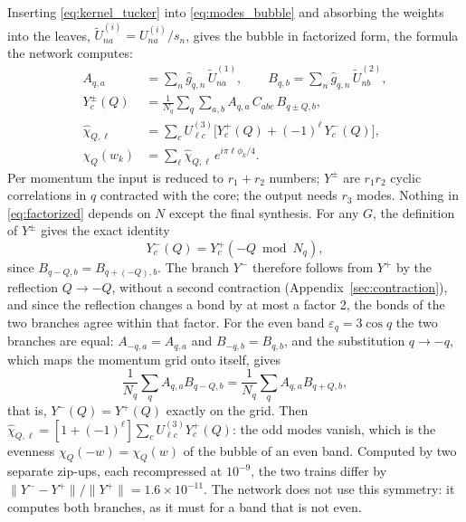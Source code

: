 \documentclass[aps,prb,reprint,a4paper]{revtex4-2}
\begin{document}
Inserting \eqref{eq:kernel_tucker} into \eqref{eq:modes_bubble} and absorbing the weights into the leaves, $\tilde U^{(i)}_{na}=U^{(i)}_{na}/s_n$, gives the bubble in factorized form, the formula the network computes:
\begin{equation}
\begin{aligned}
A_{q,a}&=\sum_n\hat g_{q,n}\,\tilde U^{(1)}_{na},\qquad B_{q,b}=\sum_n\hat g_{q,n}\,\tilde U^{(2)}_{nb},\\
Y^\pm_c(Q)&=\frac1{N_q}\sum_q\sum_{a,b}A_{q,a}\,C_{abc}\,B_{q\pm Q,b},\\
\hat\chi_{Q,\ell}&=\sum_cU^{(3)}_{\ell c}\Big[Y^+_c(Q)+(-1)^\ell\,Y^-_c(Q)\Big],\\
\chi_Q(w_k)&=\sum_\ell\hat\chi_{Q,\ell}\,e^{i\pi\ell\phi_k/4}.
\end{aligned}
\label{eq:factorized}
\end{equation}
Per momentum the input is reduced to $r_1+r_2$ numbers; $Y^\pm$ are $r_1r_2$ cyclic correlations in $q$ contracted with the core; the output needs $r_3$ modes. Nothing in \eqref{eq:factorized} depends on $N$ except the final synthesis. For any $G$, the definition of $Y^\pm$ gives the exact identity
\begin{equation}
  Y^-_c(Q)=Y^+_c(-Q\bmod N_q),
  \label{eq:yminus_identity}
\end{equation}
since $B_{q-Q,b}=B_{q+(-Q),b}$. The branch $Y^-$ therefore follows from $Y^+$ by the reflection $Q\to-Q$, without a second contraction (Appendix~\ref{sec:contraction}), and since the reflection changes a bond by at most a factor 2, the bonds of the two branches agree within that factor. For the even band $\varepsilon_q=3\cos q$ the two branches are equal: $A_{-q,a}=A_{q,a}$ and $B_{-q,b}=B_{q,b}$, and the substitution $q\to-q$, which maps the momentum grid onto itself, gives
\begin{equation}
  \frac1{N_q}\sum_qA_{q,a}B_{q-Q,b}=\frac1{N_q}\sum_qA_{q,a}B_{q+Q,b},
  \label{eq:reflection}
\end{equation}
that is, $Y^-(Q)=Y^+(Q)$ exactly on the grid. Then $\hat\chi_{Q,\ell}=[1+(-1)^\ell]\sum_cU^{(3)}_{\ell c}Y^+_c(Q)$: the odd modes vanish, which is the evenness $\chi_Q(-w)=\chi_Q(w)$ of the bubble of an even band. Computed by two separate zip-ups, each recompressed at $10^{-9}$, the two trains differ by $\lVert Y^--Y^+\rVert/\lVert Y^+\rVert=1.6\times10^{-11}$. The network does not use this symmetry: it computes both branches, as it must for a band that is not even.
\end{document}
